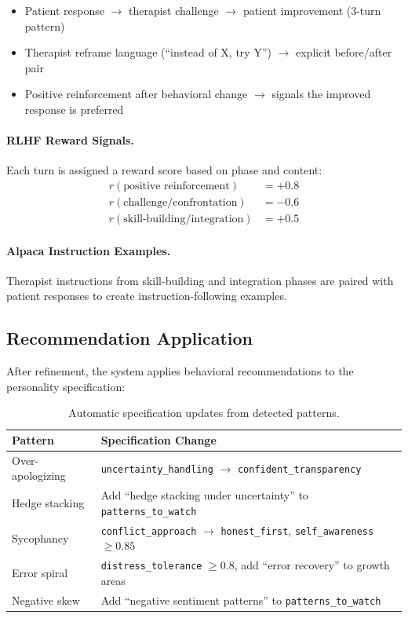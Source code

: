 \documentclass[11pt,a4paper]{article}
\begin{document}
\begin{itemize}[nosep]
  \item Patient response $\rightarrow$ therapist challenge $\rightarrow$ patient improvement (3-turn pattern)
  \item Therapist reframe language (``instead of X, try Y'') $\rightarrow$ explicit before/after pair
  \item Positive reinforcement after behavioral change $\rightarrow$ signals the improved response is preferred
\end{itemize}

\paragraph{RLHF Reward Signals.} Each turn is assigned a reward score based on phase and content:
\begin{align}
r(\text{positive reinforcement}) &= +0.8 \\
r(\text{challenge/confrontation}) &= -0.6 \\
r(\text{skill-building/integration}) &= +0.5
\end{align}

\paragraph{Alpaca Instruction Examples.} Therapist instructions from skill-building and integration phases are paired with patient responses to create instruction-following examples.

\subsection{Recommendation Application}

After refinement, the system applies behavioral recommendations to the personality specification:

\begin{table}[h]
\centering
\caption{Automatic specification updates from detected patterns.}
\label{tab:recommendations}
\begin{tabular}{@{}lp{8cm}@{}}
\toprule
\textbf{Pattern} & \textbf{Specification Change} \\
\midrule
Over-apologizing & \texttt{uncertainty\_handling} $\rightarrow$ \texttt{confident\_transparency} \\
Hedge stacking & Add ``hedge stacking under uncertainty'' to \texttt{patterns\_to\_watch} \\
Sycophancy & \texttt{conflict\_approach} $\rightarrow$ \texttt{honest\_first}, \texttt{self\_awareness} $\geq 0.85$ \\
Error spiral & \texttt{distress\_tolerance} $\geq 0.8$, add ``error recovery'' to growth areas \\
Negative skew & Add ``negative sentiment patterns'' to \texttt{patterns\_to\_watch} \\
\bottomrule
\end{tabular}
\end{table}
\end{document}
